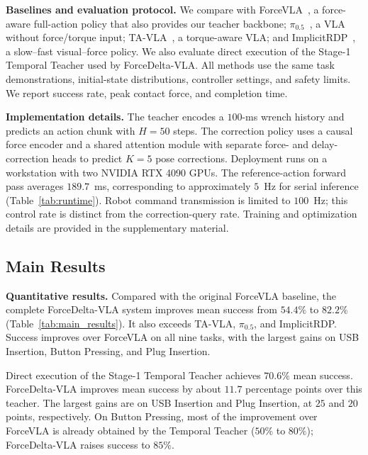 \noindent\textbf{Baselines and evaluation protocol.}
We compare with ForceVLA~\cite{yu2025forcevlaenhancingvlamodels}, a force-aware full-action policy that also provides our teacher backbone; $\pi_{0.5}$~\cite{intelligence2025pi05visionlanguageactionmodelopenworld}, a VLA without force/torque input; TA-VLA~\cite{zhang2025tavlaelucidatingdesignspace}, a torque-aware VLA; and ImplicitRDP~\cite{chen2026implicitrdpendtoendvisualforcediffusion}, a slow--fast visual--force policy. We also evaluate direct execution of the Stage-1 Temporal Teacher used by ForceDelta-VLA. All methods use the same task demonstrations, initial-state distributions, controller settings, and safety limits. We report success rate, peak contact force, and completion time.

\noindent\textbf{Implementation details.}
The teacher encodes a $100$-ms wrench history and predicts an action chunk with $H{=}50$ steps. The correction policy uses a causal force encoder and a shared attention module with separate force- and delay-correction heads to predict $K{=}5$ pose corrections. Deployment runs on a workstation with two NVIDIA RTX 4090 GPUs. The reference-action forward pass averages $189.7$~ms, corresponding to approximately $5$~Hz for serial inference (Table~\ref{tab:runtime}). Robot command transmission is limited to $100$~Hz; this control rate is distinct from the correction-query rate. Training and optimization details are provided in the supplementary material.

\subsection{Main Results}
\label{sec:exp_main}

\noindent\textbf{Quantitative results.}
Compared with the original ForceVLA baseline, the complete ForceDelta-VLA system improves mean success from $54.4\%$ to $82.2\%$ (Table~\ref{tab:main_results}). It also exceeds TA-VLA, $\pi_{0.5}$, and ImplicitRDP. Success improves over ForceVLA on all nine tasks, with the largest gains on USB Insertion, Button Pressing, and Plug Insertion.

Direct execution of the Stage-1 Temporal Teacher achieves $70.6\%$ mean success. ForceDelta-VLA improves mean success by about $11.7$ percentage points over this teacher. The largest gains are on USB Insertion and Plug Insertion, at $25$ and $20$ points, respectively. On Button Pressing, most of the improvement over ForceVLA is already obtained by the Temporal Teacher ($50\%$ to $80\%$); ForceDelta-VLA raises success to $85\%$.

